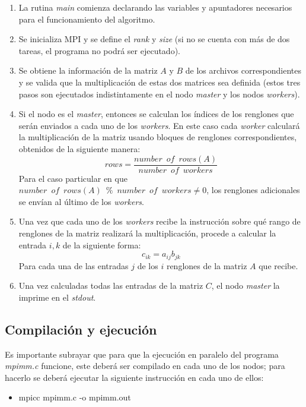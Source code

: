 \documentclass[DIV=calc, paper=letter, fontsize=11pt, twocolumn]{scrartcl}
\begin{document}
\begin{enumerate}
    \item La rutina \textit{main} comienza declarando las variables y apuntadores necesarios para el funcionamiento del algoritmo.
    \item Se inicializa MPI y se define el \textit{rank} y \textit{size} (si no se cuenta con más de dos tareas, el programa no podrá ser ejecutado).
    \item Se obtiene la información de la matriz $A$ y $B$ de los archivos correspondientes y se valida que la multiplicación de estas dos matrices sea definida (estos tres pasos son ejecutados indistintamente en el nodo \textit{master} y los nodos \textit{workers}).
    \item Si el nodo es el \textit{master}, entonces se calculan los índices de los renglones que serán enviados a cada uno de los \textit{workers}. En este caso cada \textit{worker} calculará la multiplicación de la matriz usando bloques de renglones correspondientes, obtenidos de la siguiente manera:
    \begin{equation}
        rows = \frac{number \phantom{1} of \phantom{1} rows(A)}{number \phantom{1} of \phantom{1} workers}
    \end{equation}
    Para el caso particular en que $number \phantom{1} of \phantom{1} rows(A) \phantom{1} \% \phantom{1} number \phantom{1} of \phantom{1} workers \neq 0$, los renglones adicionales se envían al último de los \textit{workers}.
    \item Una vez que cada uno de los \textit{workers} recibe la instrucción sobre qué rango de renglones de la matriz realizará la multiplicación, procede a calcular la entrada $i,k$ de la siguiente forma:
    \begin{equation}
        c_{ik}=a_{ij}b_{jk}
    \end{equation}
    Para cada una de las entradas $j$ de los $i$ renglones de la matriz $A$ que recibe.
    \item Una vez calculadas todas las entradas de la matriz $C$, el nodo \textit{master} la imprime en el \textit{stdout}.
\end{enumerate}

\subsection{Compilación y ejecución}

Es importante subrayar que para que la ejecución en paralelo del programa \textit{mpimm.c} funcione, este deberá ser compilado en cada uno de los nodos; para hacerlo se deberá ejecutar la siguiente instrucción en cada uno de ellos:
\begin{itemize}
    \item mpicc mpimm.c -o mpimm.out
\end{itemize}
\end{document}
